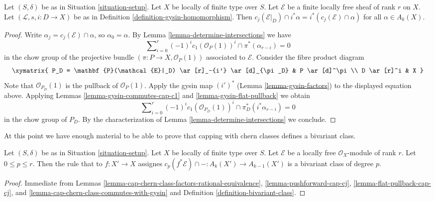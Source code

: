 \begin{lemma}
\label{lemma-cap-chern-class-commutes-with-gysin}
Let $(S, \delta)$ be as in Situation \ref{situation-setup}.
Let $X$ be locally of finite type over $S$.
Let $\mathcal{E}$ be a finite locally free sheaf of rank $r$ on $X$.
Let $(\mathcal{L}, s, i : D \to X)$ be as in
Definition \ref{definition-gysin-homomorphism}.
Then $c_j(\mathcal{E}|_D) \cap i^*\alpha = i^*(c_j(\mathcal{E}) \cap \alpha)$
for all $\alpha \in A_k(X)$.
\end{lemma}

\begin{proof}
Write $\alpha_j = c_j(\mathcal{E}) \cap \alpha$, so $\alpha_0 = \alpha$.
By Lemma \ref{lemma-determine-intersections} we have
$$
\sum\nolimits_{i = 0}^r
(-1)^i c_1(\mathcal{O}_P(1))^i \cap
\pi^*(\alpha_{r - i}) = 0
$$
in the chow group of the projective bundle
$(\pi : P \to X, \mathcal{O}_P(1))$
associated to $\mathcal{E}$. Consider the fibre product diagram
$$
\xymatrix{
P_D = \mathbf{P}(\mathcal{E}|_D) \ar[r]_-{i'} \ar[d]_{\pi_D} &
P \ar[d]^\pi \\
D \ar[r]^i & X
}
$$
Note that $\mathcal{O}_{P_D}(1)$ is the pullback of $\mathcal{O}_P(1)$.
Apply the gysin map $(i')^*$ (Lemma \ref{lemma-gysin-factors}) to the
displayed equation above.
Applying Lemmas \ref{lemma-gysin-commutes-cap-c1} and
\ref{lemma-gysin-flat-pullback} we obtain
$$
\sum\nolimits_{i = 0}^r
(-1)^i c_1(\mathcal{O}_{P_D}(1))^i \cap
\pi_D^*(i^*\alpha_{r - i}) = 0
$$
in the chow group of $P_D$.
By the characterization of Lemma \ref{lemma-determine-intersections}
we conclude.
\end{proof}

\noindent
At this point we have enough material to be able to prove that
capping with chern classes defines a bivariant class.

\begin{lemma}
\label{lemma-cap-cp-bivariant}
Let $(S, \delta)$ be as in Situation \ref{situation-setup}.
Let $X$ be locally of finite type over $S$.
Let $\mathcal{E}$ be a locally free $\mathcal{O}_X$-module
of rank $r$. Let $0 \leq p \leq r$.
Then the rule that to $f : X' \to X$ assignes
$c_p(f^*\mathcal{E}) \cap - : A_k(X') \to A_{k - 1}(X')$
is a bivariant class of degree $p$.
\end{lemma}

\begin{proof}
Immediate from Lemmas
\ref{lemma-cap-chern-class-factors-rational-equivalence},
\ref{lemma-pushforward-cap-cj},
\ref{lemma-flat-pullback-cap-cj}, and
\ref{lemma-cap-chern-class-commutes-with-gysin}
and Definition \ref{definition-bivariant-class}.
\end{proof}

